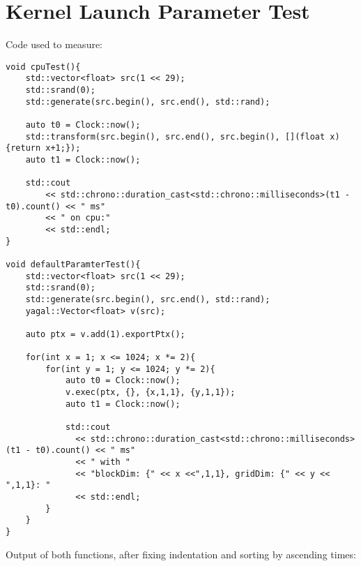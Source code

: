 \chapter{Kernel Launch Parameter Test} \label{app:defaultKernelParams}

Code used to measure:
\begin{lstlisting}
void cpuTest(){
    std::vector<float> src(1 << 29);
    std::srand(0);
    std::generate(src.begin(), src.end(), std::rand);

    auto t0 = Clock::now();
    std::transform(src.begin(), src.end(), src.begin(), [](float x){return x+1;});
    auto t1 = Clock::now();

    std::cout 
        << std::chrono::duration_cast<std::chrono::milliseconds>(t1 - t0).count() << " ms" 
        << " on cpu:"
        << std::endl;
}

void defaultParamterTest(){
    std::vector<float> src(1 << 29);
    std::srand(0);
    std::generate(src.begin(), src.end(), std::rand);
    yagal::Vector<float> v(src);

    auto ptx = v.add(1).exportPtx();

    for(int x = 1; x <= 1024; x *= 2){
        for(int y = 1; y <= 1024; y *= 2){
            auto t0 = Clock::now();
            v.exec(ptx, {}, {x,1,1}, {y,1,1});
            auto t1 = Clock::now();

            std::cout 
              << std::chrono::duration_cast<std::chrono::milliseconds>(t1 - t0).count() << " ms" 
              << " with "
              << "blockDim: {" << x <<",1,1}, gridDim: {" << y << ",1,1}: "
              << std::endl;
        }
    }
}
\end{lstlisting}

Output of both functions, after fixing indentation and sorting by ascending times:

